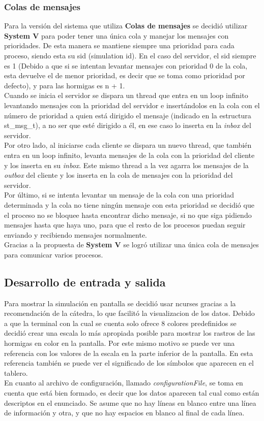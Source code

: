 \documentclass[a4paper,10pt]{article}
\begin{document}
\subsubsection{Colas de mensajes}
Para la versión del sistema que utiliza \textbf{Colas de mensajes} se decidió utilizar \textbf{System V} para poder tener una única cola y 
manejar los mensajes con prioridades. De esta manera se mantiene siempre una prioridad para cada proceso, siendo esta su sid (simulation id).
En el caso del servidor, el sid siempre es 1 (Debido a que si se intentan levantar mensajes con prioridad 0 de la cola, esta devuelve el de menor 
prioridad, es decir que se toma como prioridad por defecto), y para las hormigas es n + 1.\\
Cuando se inicia el servidor se dispara un thread que entra en un loop infinito levantando mensajes con la prioridad del servidor e 
insertándolos en la cola con el número de prioridad a quien está dirigido el mensaje (indicado en la estructura st\_msg\_t), a no ser que esté 
dirigido a él, en ese caso lo inserta en la \textit{inbox} del servidor.\\
Por otro lado, al iniciarse cada cliente se dispara un nuevo thread, que también entra en un loop infinito, levanta mensajes de la cola 
con la prioridad del cliente y los inserta en su \textit{inbox}. Este mismo thread a la vez agarra los mensajes de la \textit{outbox} del 
cliente y los inserta en la cola de mensajes con la prioridad del servidor.\\
Por último, si se intenta levantar un mensaje de la cola con una prioridad determinada y la cola no tiene ningún mensaje con esta prioridad se 
decidió que el proceso no se bloquee hasta encontrar dicho mensaje, si no que siga pidiendo mensajes hasta que haya uno, para que el resto de los 
procesos puedan seguir enviando y recibiendo mensajes normalmente.\\
Gracias a la propuesta de \textbf{System V} se logró utilizar una única cola de mensajes para comunicar varios procesos.





\subsection{Desarrollo de entrada y salida}
Para mostrar la simulación en pantalla se decidió usar ncurses gracias a la recomendación de la cátedra, lo que facilitó la visualizacion de los 
datos. Debido a que la terminal con la cual se cuenta solo ofrece 8 colores predefinidos se decidió crear una escala lo más apropiada posible 
para mostrar los rastros de las hormigas en color en la pantalla. Por este mismo motivo se puede ver una referencia con los valores de la escala 
en la parte inferior de la pantalla. En esta referencia también se puede ver el significado de los símbolos que aparecen en el tablero.\\
En cuanto al archivo de configuración, llamado \textit{configurationFile}, se toma en cuenta que está bien formado, es decir que los datos 
aparecen tal cual como están descriptos en el enunciado. Se asume que no hay líneas en blanco entre una línea de información y otra, y que no 
hay espacios en blanco al final de cada línea.


\bigskip
\end{document}
